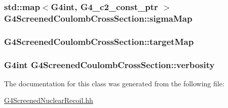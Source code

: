 \subsubsection[{\texorpdfstring{sigma\+Map}{sigmaMap}}]{\setlength{\rightskip}{0pt plus 5cm}std\+::map$<$G4int, {\bf G4\+\_\+c2\+\_\+const\+\_\+ptr} $>$ G4\+Screened\+Coulomb\+Cross\+Section\+::sigma\+Map\hspace{0.3cm}{\ttfamily [protected]}}\hypertarget{classG4ScreenedCoulombCrossSection_ae6c847c6a7aac54186ab96ea4d44be3a}{}\label{classG4ScreenedCoulombCrossSection_ae6c847c6a7aac54186ab96ea4d44be3a}
\subsubsection[{\texorpdfstring{target\+Map}{targetMap}}]{ G4\+Screened\+Coulomb\+Cross\+Section\+::target\+Map\hspace{0.3cm}{\ttfamily [protected]}}\hypertarget{classG4ScreenedCoulombCrossSection_a4f47a69e60be10d7040de1fbc9612887}{}\label{classG4ScreenedCoulombCrossSection_a4f47a69e60be10d7040de1fbc9612887}
\subsubsection[{\texorpdfstring{verbosity}{verbosity}}]{\setlength{\rightskip}{0pt plus 5cm}G4int G4\+Screened\+Coulomb\+Cross\+Section\+::verbosity\hspace{0.3cm}{\ttfamily [protected]}}\hypertarget{classG4ScreenedCoulombCrossSection_a9b29c3d5aa9807d66afee4e59905d7e3}{}\label{classG4ScreenedCoulombCrossSection_a9b29c3d5aa9807d66afee4e59905d7e3}


The documentation for this class was generated from the following file\+:\begin{DoxyCompactItemize}
\item 
\hyperlink{G4ScreenedNuclearRecoil_8hh}{G4\+Screened\+Nuclear\+Recoil.\+hh}\end{DoxyCompactItemize}
